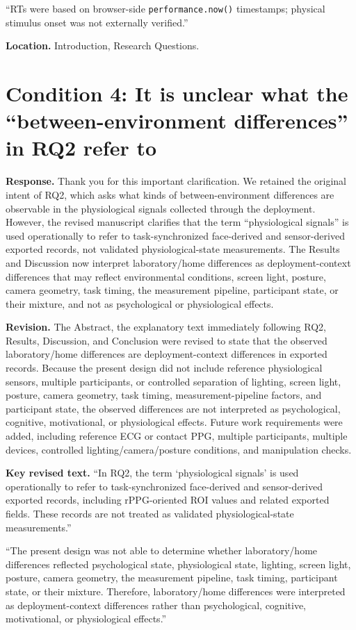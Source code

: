 \documentclass[11pt]{article}
\newcommand{\condition}[2]{\section*{Condition #1: #2}}
\begin{document}
``RTs were based on browser-side \texttt{performance.now()} timestamps; physical stimulus onset was not externally verified.''

\textbf{Location.}
Introduction, Research Questions.

\condition{4}{It is unclear what the ``between-environment differences'' in RQ2 refer to}
\textbf{Response.}
Thank you for this important clarification.
We retained the original intent of RQ2, which asks what kinds of between-environment differences are observable in the physiological signals collected through the deployment.
However, the revised manuscript clarifies that the term ``physiological signals'' is used operationally to refer to task-synchronized face-derived and sensor-derived exported records, not validated physiological-state measurements.
The Results and Discussion now interpret laboratory/home differences as deployment-context differences that may reflect environmental conditions, screen light, posture, camera geometry, task timing, the measurement pipeline, participant state, or their mixture, and not as psychological or physiological effects.

\textbf{Revision.}
The Abstract, the explanatory text immediately following RQ2, Results, Discussion, and Conclusion were revised to state that the observed laboratory/home differences are deployment-context differences in exported records.
Because the present design did not include reference physiological sensors, multiple participants, or controlled separation of lighting, screen light, posture, camera geometry, task timing, measurement-pipeline factors, and participant state, the observed differences are not interpreted as psychological, cognitive, motivational, or physiological effects.
Future work requirements were added, including reference ECG or contact PPG, multiple participants, multiple devices, controlled lighting/camera/posture conditions, and manipulation checks.

\textbf{Key revised text.}
``In RQ2, the term `physiological signals' is used operationally to refer to task-synchronized face-derived and sensor-derived exported records, including rPPG-oriented ROI values and related exported fields. These records are not treated as validated physiological-state measurements.''

``The present design was not able to determine whether laboratory/home differences reflected psychological state, physiological state, lighting, screen light, posture, camera geometry, the measurement pipeline, task timing, participant state, or their mixture. Therefore, laboratory/home differences were interpreted as deployment-context differences rather than psychological, cognitive, motivational, or physiological effects.''
\end{document}
